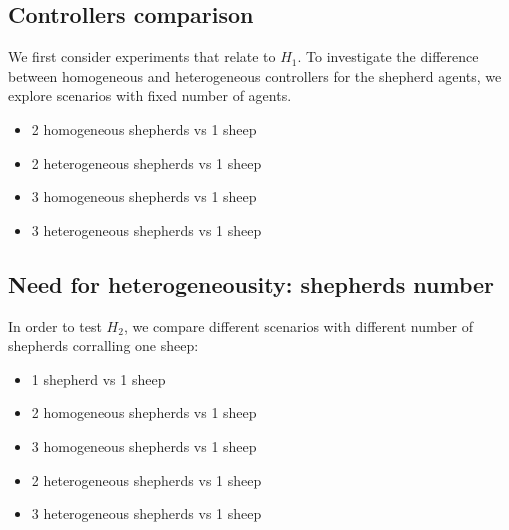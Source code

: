 \documentclass[conference]{IEEEtran}
\begin{document}
\subsection{Controllers comparison}
We first consider experiments that relate to $H_1$. To investigate the difference between homogeneous and heterogeneous controllers for the shepherd agents, we explore scenarios with fixed number of agents. 
\begin{itemize}
	\item 2 homogeneous shepherds vs 1 sheep
	\item 2 heterogeneous shepherds vs 1 sheep
	\item 3 homogeneous shepherds vs 1 sheep
	\item 3 heterogeneous shepherds vs 1 sheep
\end{itemize}

\subsection{Need for heterogeneousity: shepherds number}
In order to test $H_2$, we compare different scenarios with different number of shepherds corralling one sheep:
\begin{itemize}
	\item 1 shepherd vs 1 sheep	
	\item 2 homogeneous shepherds vs 1 sheep
	\item 3 homogeneous shepherds vs 1 sheep
	\item 2 heterogeneous shepherds vs 1 sheep
	\item 3 heterogeneous shepherds vs 1 sheep
	
\end{itemize}

\end{document}

